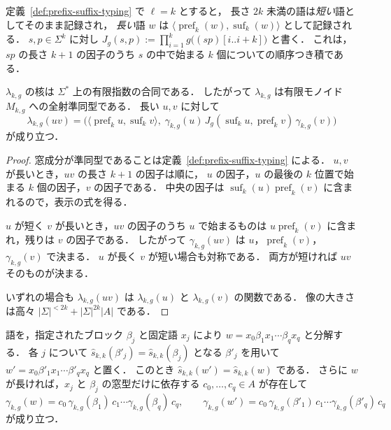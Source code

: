 定義~\ref{def:prefix-suffix-typing} で $\ell=k$ とすると，
長さ $2k$ 未満の語は\emph{短い}語としてそのまま記録され，
\emph{長い}語 $w$ は $\langle\operatorname{pref}_k(w),\operatorname{suf}_k(w)\rangle$ として記録される．
$s,p\in\Sigma^k$ に対し
$J_g(s,p):=\prod_{i=1}^{k}g\bigl((sp)[i..i+k]\bigr)$ と書く．
これは，$sp$ の長さ $k+1$ の因子のうち $s$ の中で始まる $k$ 個についての順序つき積である．

\begin{lemma}[局所群型付けは準同型である]
\label{lem:local-group-morphism}
$\lambda_{k,g}$ の核は $\Sigma^*$ 上の有限指数の合同である．
したがって $\lambda_{k,g}$ は有限モノイド $M_{k,g}$ への全射準同型である．
長い $u,v$ に対して
\[
 \lambda_{k,g}(uv)
 =\bigl(\langle\operatorname{pref}_k u,\operatorname{suf}_k v\rangle,\;
   \gamma_{k,g}(u)\,J_g(\operatorname{suf}_k u,\operatorname{pref}_k v)\,
   \gamma_{k,g}(v)\bigr)
\]
が成り立つ．
\end{lemma}

\begin{proof}
窓成分が準同型であることは定義~\ref{def:prefix-suffix-typing} による．
$u,v$ が長いとき，$uv$ の長さ $k+1$ の因子は順に，
$u$ の因子，$u$ の最後の $k$ 位置で始まる $k$ 個の因子，$v$ の因子である．
中央の因子は $\operatorname{suf}_k(u)\operatorname{pref}_k(v)$ に含まれるので，表示の式を得る．

$u$ が短く $v$ が長いとき，$uv$ の因子のうち $u$ で始まるものは
$u\operatorname{pref}_k(v)$ に含まれ，残りは $v$ の因子である．
したがって $\gamma_{k,g}(uv)$ は $u$，$\operatorname{pref}_k(v)$，$\gamma_{k,g}(v)$ で決まる．
$u$ が長く $v$ が短い場合も対称である．
両方が短ければ $uv$ そのものが決まる．

いずれの場合も $\lambda_{k,g}(uv)$ は $\lambda_{k,g}(u)$ と $\lambda_{k,g}(v)$ の関数である．
像の大きさは高々 $|\Sigma|^{<2k}+|\Sigma|^{2k}|A|$ である．
\end{proof}

\begin{lemma}[ブロック分解]
\label{lem:local-group-blocks}
語を，指定されたブロック $\beta_j$ と固定語 $x_j$ により
$w=x_0\beta_1x_1\cdots\beta_qx_q$ と分解する．
各 $j$ について $\widehat{s}_{k,k}(\beta'_j)=\widehat{s}_{k,k}(\beta_j)$ となる $\beta'_j$ を用いて
$w'=x_0\beta'_1x_1\cdots\beta'_qx_q$ と置く．
このとき $\widehat{s}_{k,k}(w')=\widehat{s}_{k,k}(w)$ である．
さらに $w$ が長ければ，$x_j$ と $\beta_j$ の窓型だけに依存する
$c_0,\ldots,c_q\in A$ が存在して
\[
 \gamma_{k,g}(w)=c_0\,\gamma_{k,g}(\beta_1)\,c_1\cdots
   \gamma_{k,g}(\beta_q)\,c_q,
 \qquad
 \gamma_{k,g}(w')=c_0\,\gamma_{k,g}(\beta'_1)\,c_1\cdots
   \gamma_{k,g}(\beta'_q)\,c_q
\]
が成り立つ．
\end{lemma}

